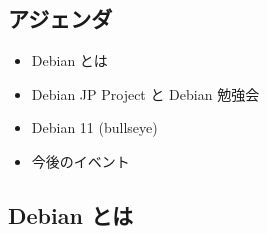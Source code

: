 \documentclass[mingoth,a4paper]{jsarticle}
\begin{document}







%  

%
%
%
% 





\subsection{アジェンダ}

\begin{itemize}
  \item Debian とは
  \item Debian JP Project と Debian 勉強会
  \item Debian 11 (bullseye)
  \item 今後のイベント
\end{itemize}

\subsection{Debian とは}
\end{document}
